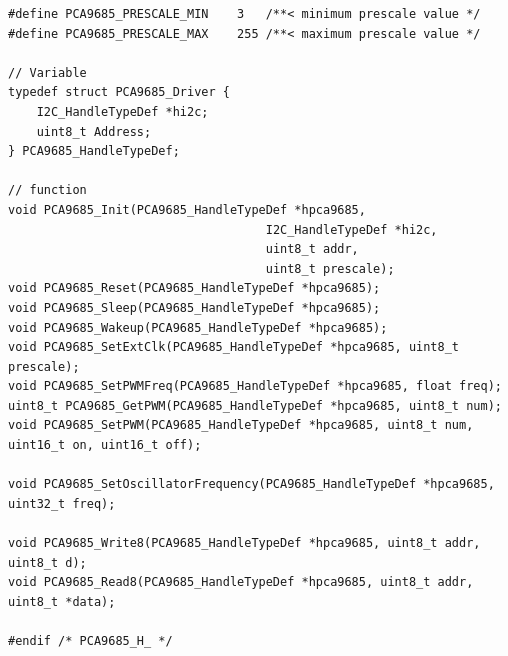 \begin{lstlisting}
#define PCA9685_PRESCALE_MIN    3   /**< minimum prescale value */
#define PCA9685_PRESCALE_MAX    255 /**< maximum prescale value */

// Variable
typedef struct PCA9685_Driver {
    I2C_HandleTypeDef *hi2c;
    uint8_t Address;
} PCA9685_HandleTypeDef;

// function
void PCA9685_Init(PCA9685_HandleTypeDef *hpca9685, 
                                    I2C_HandleTypeDef *hi2c,
                                    uint8_t addr,
                                    uint8_t prescale);
void PCA9685_Reset(PCA9685_HandleTypeDef *hpca9685);
void PCA9685_Sleep(PCA9685_HandleTypeDef *hpca9685);
void PCA9685_Wakeup(PCA9685_HandleTypeDef *hpca9685);
void PCA9685_SetExtClk(PCA9685_HandleTypeDef *hpca9685, uint8_t prescale);
void PCA9685_SetPWMFreq(PCA9685_HandleTypeDef *hpca9685, float freq);
uint8_t PCA9685_GetPWM(PCA9685_HandleTypeDef *hpca9685, uint8_t num);
void PCA9685_SetPWM(PCA9685_HandleTypeDef *hpca9685, uint8_t num, uint16_t on, uint16_t off);

void PCA9685_SetOscillatorFrequency(PCA9685_HandleTypeDef *hpca9685, uint32_t freq);

void PCA9685_Write8(PCA9685_HandleTypeDef *hpca9685, uint8_t addr, uint8_t d);
void PCA9685_Read8(PCA9685_HandleTypeDef *hpca9685, uint8_t addr, uint8_t *data);

#endif /* PCA9685_H_ */
\end{lstlisting}

